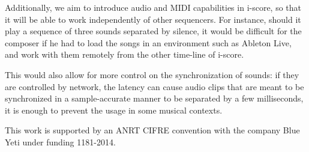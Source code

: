 \documentclass{article}
\begin{document}
Additionally, we aim to introduce audio and MIDI capabilities in i-score, so that 
it will be able to work independently of other sequencers.
For instance, should it play a sequence of three sounds separated by silence, 
it would be difficult for the composer if he had to load 
the songs in an environment such as Ableton Live, and work with them remotely from the other time-line of i-score.

This would also allow for more control on the synchronization of sounds: if they are controlled by network, 
the latency can cause audio clips that are meant to be synchronized in a sample-accurate manner to be separated by a few milliseconds, it is enough to prevent the usage in some musical contexts.

\begin{acknowledgments}
	This work is supported by an ANRT CIFRE convention with the company Blue Yeti under funding 1181-2014.    
\end{acknowledgments} 


\end{document}
